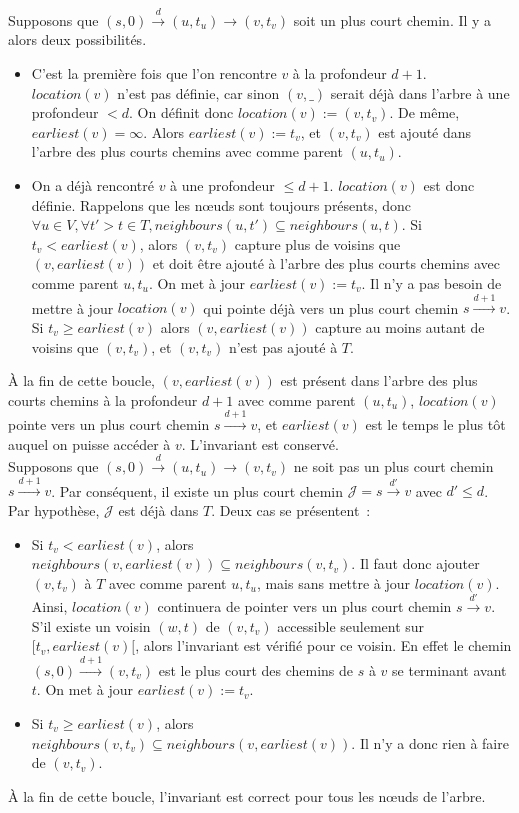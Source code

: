 \documentclass[12pt,a4paper]{article}
\begin{document}
Supposons que \((s, 0) \xrightarrow{d} (u, t_u) \rightarrow (v, t_v)\)
soit un plus court chemin. Il y a alors deux possibilités.
\begin{itemize}
\item C'est la première fois que l'on rencontre \(v\) à la profondeur
  \(d + 1\). \(location(v)\) n'est pas définie, car sinon \((v, \_)\)
  serait déjà dans l'arbre à une profondeur \(< d\). On définit donc
  \(location(v) := (v, t_v)\). De même, \(earliest(v) =
  \infty\). Alors \(earliest(v) := t_v\), et \((v, t_v)\) est ajouté
  dans l'arbre des plus courts chemins avec comme parent \((u, t_u)\).
\item On a déjà rencontré \(v\) à une profondeur \(\leq d +
  1\). \(location(v)\) est donc définie. Rappelons que les nœuds sont
  toujours présents, donc
  \(\forall u \in V, \forall t' > t \in T, neighbours(u, t') \subseteq
  neighbours(u, t)\). Si \(t_v < earliest(v)\), alors \((v, t_v)\)
  capture plus de voisins que \((v, earliest(v))\) et doit être ajouté
  à l'arbre des plus courts chemins avec comme parent \(u, t_u\). On
  met à jour \(earliest(v) := t_v\). Il n'y a pas besoin de mettre à
  jour \(location(v)\) qui pointe déjà vers un plus court chemin
  \(s \xrightarrow{d+1} v\). Si \(t_v \geq earliest(v)\) alors
  \((v, earliest(v))\) capture au moins autant de voisins que
  \((v, t_v)\), et \((v, t_v)\) n'est pas ajouté à \(T\).
\end{itemize}
À la fin de cette boucle, \((v, earliest(v))\) est présent dans
l'arbre des plus courts chemins à la profondeur \(d + 1\) avec comme
parent \((u, t_u)\), \(location(v)\) pointe vers un plus court chemin
\(s \xrightarrow{d+1} v\), et \(earliest(v)\) est le temps le plus tôt
auquel on puisse accéder à \(v\). L'invariant est conservé.\\

Supposons que \((s, 0) \xrightarrow{d} (u, t_u) \rightarrow (v, t_v)\)
ne soit pas un plus court chemin \(s \xrightarrow{d+1} v\). Par
conséquent, il existe un plus court chemin
\(\mathcal{J} = s \xrightarrow{d'} v\) avec \(d' \leq d\). Par
hypothèse, \(\mathcal{J}\) est déjà dans \(T\). Deux cas se
présentent~:
\begin{itemize}
\item Si \(t_v < earliest(v)\), alors
  \(neighbours(v, earliest(v)) \subseteq neighbours(v, t_v)\). Il faut
  donc ajouter \((v, t_v)\) à \(T\) avec comme parent \(u, t_u\), mais
  sans mettre à jour \(location(v)\). Ainsi, \(location(v)\)
  continuera de pointer vers un plus court chemin
  \(s \xrightarrow{d'} v\). S'il existe un voisin \((w, t)\) de
  \((v, t_v)\) accessible seulement sur \([t_v, earliest(v)[\), alors
  l'invariant est vérifié pour ce voisin. En effet le chemin
  \((s, 0) \xrightarrow{d+1} (v, t_v)\) est le plus court des chemins
  de \(s\) à \(v\) se terminant avant \(t\). On met à jour
  \(earliest(v) := t_v\).
\item Si \(t_v \geq earliest(v)\), alors \(neighbours(v, t_v)
  \subseteq neighbours(v, earliest(v))\). Il n'y a donc rien à faire
  de \((v, t_v)\).
\end{itemize}
À la fin de cette boucle, l'invariant est correct pour tous les nœuds
de l'arbre.\\
\end{document}
